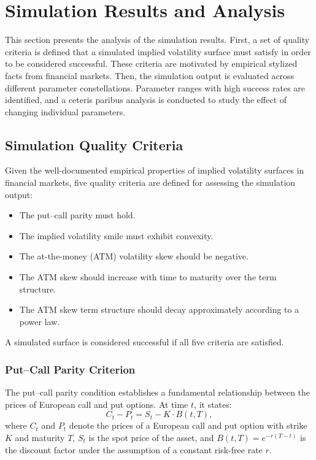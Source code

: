 \section{Simulation Results and Analysis} \label{sec:SimulationResults}

This section presents the analysis of the simulation results. First, a set of quality criteria is defined that a simulated implied volatility surface must satisfy in order to be considered successful. These criteria are motivated by empirical stylized facts from financial markets. Then, the simulation output is evaluated across different parameter constellations. Parameter ranges with high success rates are identified, and a ceteris paribus analysis is conducted to study the effect of changing individual parameters.


\subsection{Simulation Quality Criteria}

Given the well-documented empirical properties of implied volatility surfaces in financial markets, five quality criteria are defined for assessing the simulation output:
\begin{itemize}
    \item The put–call parity must hold.
    \item The implied volatility smile must exhibit convexity.
    \item The at-the-money (ATM) volatility skew should be negative.
    \item The ATM skew should increase with time to maturity over the term structure.
    \item The ATM skew term structure should decay approximately according to a power law.
\end{itemize}
A simulated surface is considered successful if all five criteria are satisfied.

\subsubsection*{Put–Call Parity Criterion}
The put–call parity condition establishes a fundamental relationship between the prices of European call and put options. At time \( t \), it states:
\begin{equation} \label{eq:PutCallParity}
    C_t - P_t = S_t - K \cdot B(t,T),
\end{equation}
where \( C_t \) and \( P_t \) denote the prices of a European call and put option with strike \( K \) and maturity \( T \), \( S_t \) is the spot price of the asset, and \( B(t,T) = e^{-r(T-t)} \) is the discount factor under the assumption of a constant risk-free rate \( r \).

